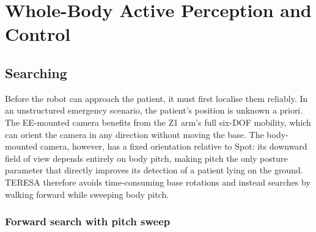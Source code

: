 \section{Whole-Body Active Perception and Control}
\label{sec:active_perception}


\subsection{Searching}
\label{sec:phase_searching}

Before the robot can approach the patient, it must first localise them
reliably. In an unstructured emergency scenario, the patient's position is
unknown a priori. The \ac{EE}-mounted camera benefits from the Z1 arm's full
six-\ac{DOF} mobility, which can orient the camera in any direction without
moving the base. The body-mounted camera, however, has a fixed orientation
relative to Spot: its downward field of view depends entirely on body pitch,
making pitch the only posture parameter that directly improves its detection of
a patient lying on the ground. \ac{TERESA} therefore avoids time-consuming base
rotations and instead searches by walking forward while sweeping body pitch.

\subsubsection{Forward search with pitch sweep}

